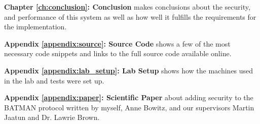 \textbf{Chapter \ref{ch:conclusion}: Conclusion} makes conclusions about the
security, and performance of this system as well as how well it fulfills the
requirements for the implementation.

\textbf{Appendix \ref{appendix:source}: Source Code} shows a few of the most
necessary code snippets and links to the full source code available online.

\textbf{Appendix \ref{appendix:lab_setup}: Lab Setup} shows how the machines
used in the lab and tests were set up.

\textbf{Appendix \ref{appendix:paper}: Scientific Paper} about adding security
to the BATMAN protocol written by myself, Anne Bowitz, and our supervisors
Martin Jaatun and Dr. Lawrie Brown.
